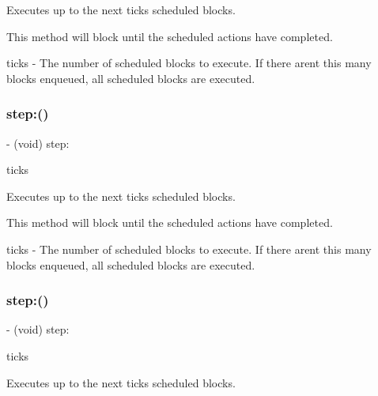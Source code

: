 Executes up to the next {\ttfamily ticks} scheduled blocks.

This method will block until the scheduled actions have completed.

ticks -\/ The number of scheduled blocks to execute. If there aren\textquotesingle{}t this many blocks enqueued, all scheduled blocks are executed. \mbox{\label{interface_r_a_c_test_scheduler_a74b5961a618f9692baf91bbd52ab08e7}} 
\subsubsection{\texorpdfstring{step\+:()}{step:()}\hspace{0.1cm}{\footnotesize\ttfamily [2/3]}}
{\footnotesize\ttfamily -\/ (void) step\+: \begin{DoxyParamCaption}\item[{(N\+S\+U\+Integer)}]{ticks }\end{DoxyParamCaption}}

Executes up to the next {\ttfamily ticks} scheduled blocks.

This method will block until the scheduled actions have completed.

ticks -\/ The number of scheduled blocks to execute. If there aren\textquotesingle{}t this many blocks enqueued, all scheduled blocks are executed. \mbox{\label{interface_r_a_c_test_scheduler_a74b5961a618f9692baf91bbd52ab08e7}} 
\subsubsection{\texorpdfstring{step\+:()}{step:()}\hspace{0.1cm}{\footnotesize\ttfamily [3/3]}}
{\footnotesize\ttfamily -\/ (void) step\+: \begin{DoxyParamCaption}\item[{(N\+S\+U\+Integer)}]{ticks }\end{DoxyParamCaption}}

Executes up to the next {\ttfamily ticks} scheduled blocks.

